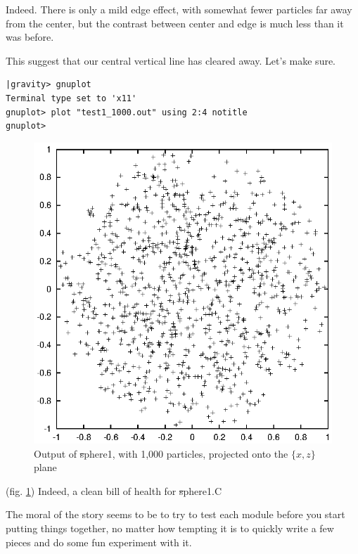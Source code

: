 \carol
Indeed.  There is only a mild edge effect, with somewhat fewer
particles far away from the center, but the contrast between center
and edge is much less than it was before.

\alice
This suggest that our central vertical line has cleared away.  Let's
make sure.

\cba

\begin{small}
\begin{verbatim}
|gravity> gnuplot
Terminal type set to 'x11'
gnuplot> plot "test1_1000.out" using 2:4 notitle
gnuplot>
\end{verbatim}
\end{small}

\begin{figure}[htb]
\centering
\includegraphics[width=4.5in]{chap9/test1xz1000.ps}
\caption[xz plot of {\st sphere1} output]
{Output of {\st sphere1}, with 1,000 particles, projected onto the
$\{x,z\}$ plane}
\label{fig:sphere1xz1000}
\end{figure}

\abc

\bob
(fig. \ref{fig:sphere1xz1000}) 
Indeed, a clean bill of health for {\st sphere1.C}

\carol
The moral of the story seems to be to try to test each module before
you start putting things together, no matter how tempting it is to
quickly write a few pieces and do some fun experiment with it.

